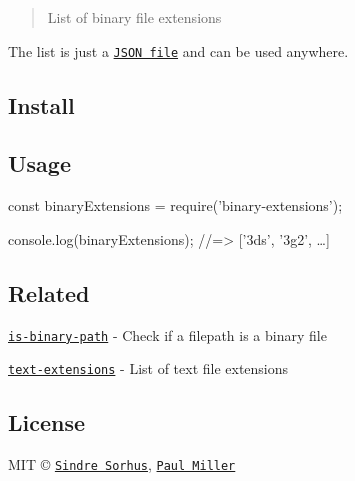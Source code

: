 \begin{quote}
List of binary file extensions \end{quote}


The list is just a \href{binary-extensions.json}{\tt J\+S\+ON file} and can be used anywhere.

\subsection*{Install}




\subsection*{Usage}


\begin{DoxyCode}
const binaryExtensions = require('binary-extensions');

console.log(binaryExtensions);
//=> ['3ds', '3g2', …]
\end{DoxyCode}


\subsection*{Related}


\begin{DoxyItemize}
\item \href{https://github.com/sindresorhus/is-binary-path}{\tt is-\/binary-\/path} -\/ Check if a filepath is a binary file
\item \href{https://github.com/sindresorhus/text-extensions}{\tt text-\/extensions} -\/ List of text file extensions
\end{DoxyItemize}

\subsection*{License}

M\+IT © \href{https://sindresorhus.com}{\tt Sindre Sorhus}, \href{https://paulmillr.com}{\tt Paul Miller} 